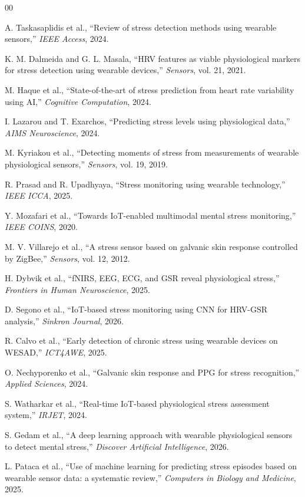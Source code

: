 \documentclass[conference]{IEEEtran}
\begin{document}
\begin{thebibliography}{00}

A. Taskasaplidis et al.,
``Review of stress detection methods using
wearable sensors,''
\textit{IEEE Access}, 2024.

K. M. Dalmeida and G. L. Masala,
``HRV features as viable physiological markers
for stress detection using wearable devices,''
\textit{Sensors}, vol. 21, 2021.

M. Haque et al.,
``State-of-the-art of stress prediction from
heart rate variability using AI,''
\textit{Cognitive Computation}, 2024.

I. Lazarou and T. Exarchos,
``Predicting stress levels using physiological
data,''
\textit{AIMS Neuroscience}, 2024.

M. Kyriakou et al.,
``Detecting moments of stress from measurements
of wearable physiological sensors,''
\textit{Sensors}, vol. 19, 2019.

R. Prasad and R. Upadhyaya,
``Stress monitoring using wearable technology,''
\textit{IEEE ICCA}, 2025.

Y. Mozafari et al.,
``Towards IoT-enabled multimodal mental stress
monitoring,''
\textit{IEEE COINS}, 2020.

M. V. Villarejo et al.,
``A stress sensor based on galvanic skin
response controlled by ZigBee,''
\textit{Sensors}, vol. 12, 2012.

H. Dybvik et al.,
``fNIRS, EEG, ECG, and GSR reveal physiological
stress,''
\textit{Frontiers in Human Neuroscience}, 2025.

D. Segono et al.,
``IoT-based stress monitoring using CNN for
HRV-GSR analysis,''
\textit{Sinkron Journal}, 2026.

R. Calvo et al.,
``Early detection of chronic stress using
wearable devices on WESAD,''
\textit{ICT4AWE}, 2025.

O. Nechyporenko et al.,
``Galvanic skin response and PPG for stress
recognition,''
\textit{Applied Sciences}, 2024.

S. Watharkar et al.,
``Real-time IoT-based physiological stress
assessment system,''
\textit{IRJET}, 2024.

S. Gedam et al.,
``A deep learning approach with wearable
physiological sensors to detect mental stress,''
\textit{Discover Artificial Intelligence}, 2026.

L. Pataca et al.,
``Use of machine learning for predicting stress
episodes based on wearable sensor data:
a systematic review,''
\textit{Computers in Biology and Medicine}, 2025.

\end{thebibliography}
\end{document}
